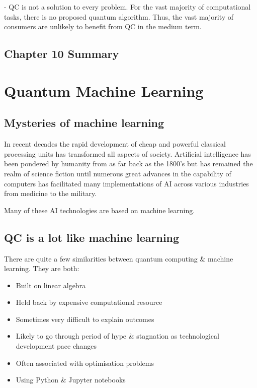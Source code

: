 \documentclass{book}
\begin{document}
- QC is not a solution to every problem. For the vast majority of computational tasks, there is no proposed quantum algorithm. Thus, the vast majority of consumers are unlikely to benefit from QC in the medium term.


\section{Chapter 10 Summary}

\chapter{Quantum Machine Learning}

\section{Mysteries of machine learning}


In recent decades the rapid development of cheap and powerful classical processing units has transformed all aspects of society. Artificial intelligence has been pondered by humanity from as far back as the 1800's but has remained the realm of science fiction until numerous great advances in the capability of computers has facilitated many implementations of AI across various industries from medicine to the military. 

Many of these AI technologies are based on machine learning. 

\section{QC is a lot like machine learning}

There are quite a few similarities between quantum computing \& machine learning. They are both:

\begin{itemize}
    \item Built on linear algebra
    \item Held back by expensive computational resource
    \item Sometimes very difficult to explain outcomes 
    \item Likely to go through period of hype \& stagnation as technological development pace changes
    \item Often associated with optimisation problems 
    \item Using Python \& Jupyter notebooks 
\end{itemize}
\end{document}
